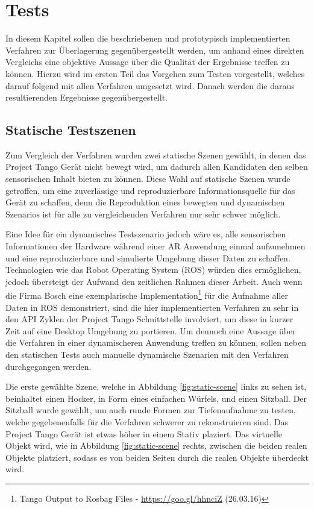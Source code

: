 \chapter{Tests} \label{sec:evaluation}

In diesem Kapitel sollen die beschriebenen und prototypisch implementierten Verfahren zur Überlagerung gegenübergestellt werden, um anhand eines direkten Vergleichs eine objektive Aussage über die Qualität der Ergebnisse treffen zu können. Hierzu wird im ersten Teil das Vorgehen zum Testen vorgestellt, welches darauf folgend mit allen Verfahren umgesetzt wird. Danach werden die daraus resultierenden Ergebnisse gegenübergestellt.

\section{Statische Testszenen}

Zum Vergleich der Verfahren wurden zwei statische Szenen gewählt, in denen das Project Tango Gerät nicht bewegt wird, um dadurch allen Kandidaten den selben sensorischen Inhalt bieten zu können. Diese Wahl auf statische Szenen wurde getroffen, um eine zuverlässige und reproduzierbare Informationsquelle für das Gerät zu schaffen, denn die Reproduktion eines bewegten und dynamischen Szenarios ist für alle zu vergleichenden Verfahren nur sehr schwer möglich. 

Eine Idee für ein dynamisches Testszenario jedoch wäre es, alle sensorischen Informationen der Hardware während einer AR Anwendung einmal aufzunehmen und eine reproduzierbare und simulierte Umgebung dieser Daten zu schaffen. Technologien wie das Robot Operating System (ROS) würden dies ermöglichen, jedoch übersteigt der Aufwand den zeitlichen Rahmen dieser Arbeit. Auch wenn die Firma Bosch eine exemplarische Implementation\footnote{Tango Output to Rosbag Files - \url{https://goo.gl/hhnciZ} (26.03.16)} für die Aufnahme aller Daten in ROS demonstriert, sind die hier implementierten Verfahren zu sehr in den API Zyklen der Project Tango Schnittstelle involviert, um diese in kurzer Zeit auf eine Desktop Umgebung zu portieren. Um dennoch eine Aussage über die Verfahren in einer dynamischeren Anwendung treffen zu können, sollen neben den statischen Tests auch manuelle dynamische Szenarien mit den Verfahren durchgegangen werden.

Die erste gewählte Szene, welche in Abbildung \ref{fig:static-scene} links zu sehen ist, beinhaltet einen Hocker, in Form eines einfachen  Würfels, und einen Sitzball. Der Sitzball wurde gewählt, um auch runde Formen zur Tiefenaufnahme zu testen, welche gegebenenfalls für die Verfahren schwerer zu rekonstruieren sind. Das Project Tango Gerät ist etwas höher in einem Stativ plaziert. Das virtuelle Objekt wird, wie in Abbildung \ref{fig:static-scene} rechts, zwischen die beiden realen Objekte platziert, sodass es von beiden Seiten durch die realen Objekte überdeckt wird. 

